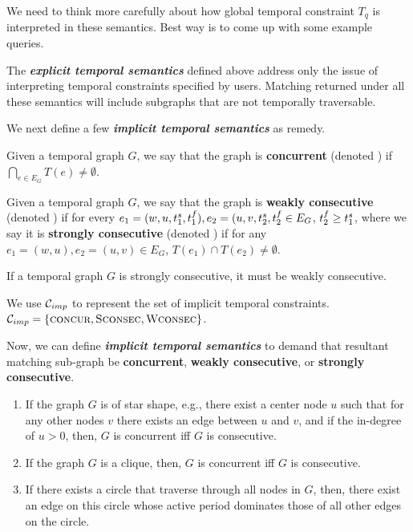  We need to think more carefully about how global temporal
constraint $T_q$ is interpreted in these semantics. Best way is to come up with
some example queries.

\SmallSpace

The {\bf {\em explicit temporal semantics}} defined above address only the issue
of interpreting temporal constraints specified by users. Matching returned under
all these semantics will include subgraphs that are not temporally traversable.

We next define a few {\bf {\em implicit temporal semantics}} as remedy. 

\begin{defn}
  \label{def:concur}
  Given a temporal graph $G$, we say that the graph is {\bf concurrent} (denoted \concurrent) if
  $\displaystyle\bigcap_{e \in E_G}T(e) \neq \emptyset$.
\end{defn}

\begin{defn}
  \label{def:consec}  
  Given a temporal graph $G$, we say that the graph is \textbf{weakly
    consecutive} (denoted \weakConsec{}) if for every $e_1 = (w,u, t^s_1 ,
  t^f_1), e_2 = (u,v, t^s_2, t^f_2 \in E_G$, $t^f_2 \geq t^s_1$, where we say it
  is {\bf strongly consecutive} (denoted \strongConsec{} ) if for any $e_1
  = (w,u), e_2=(u,v) \in E_G$, $T(e_1) \cap T(e_2) \neq \emptyset$.
\end{defn}

\begin{lemma}
If a temporal graph $G$ is strongly consecutive, it must be weakly consecutive.
\end{lemma}

We use $\mathcal{C}_{imp}$ to represent the set of implicit temporal constraints. $\mathcal{C}_{imp} =
\{\textsc{concur}, \textsc{Sconsec}, \textsc{Wconsec}\}$.

Now, we can define {\bf {\em implicit temporal semantics}} to demand that
resultant matching sub-graph be \textbf{concurrent}, \textbf{weakly
  consecutive}, or \textbf{strongly consecutive}.

\SmallSpace
{}
 \begin{enumerate}
	\item If the graph $G$ is of star shape, e.g., there exist a center node
          $u$ such that for any other nodes $v$ there exists an edge between $u$
          and $v$, and if the in-degree of $u>0$, then, $G$ is concurrent iff $G$ is consecutive.
	\item If the graph $G$ is a clique, then, $G$ is concurrent iff $G$ is
          consecutive.
	\item If there exists a circle that traverse through all nodes in $G$,
          then, there exist an edge on this circle whose active period dominates
          those of all other edges on the circle.
	
\end{enumerate}

